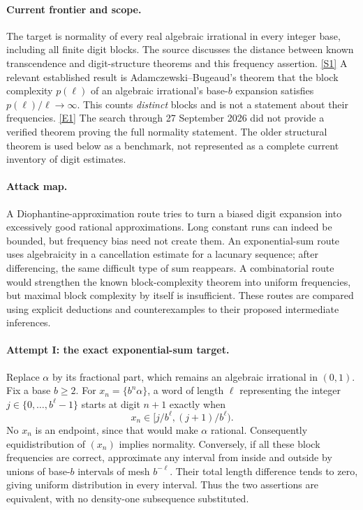 \documentclass[11pt,a4paper]{article}
\newcommand{\sref}[2]{\hyperlink{source:#1:#2}{[S#2]}}
\newcommand{\eref}[2]{\hyperlink{extra:#1:#2}{[E#2]}}
\numberwithin{equation}{section}
\begin{document}
\paragraph{Current frontier and scope.}
The target is normality of every real algebraic irrational in every
integer base, including all finite digit blocks.  The source discusses
the distance between known transcendence and digit-structure theorems
and this frequency assertion. \sref{133}{1}
A relevant established result is Adamczewski--Bugeaud's theorem that
the block complexity $p(\ell)$ of an algebraic irrational's base-$b$
expansion satisfies $p(\ell)/\ell\to\infty$.  This counts \emph{distinct}
blocks and is not a statement about their frequencies.
\eref{133}{1}  The search through 27 September 2026 did not provide a
verified theorem proving the full normality statement.  The older
structural theorem is used below as a benchmark, not represented as
a complete current inventory of digit estimates.

\paragraph{Attack map.}
A Diophantine-approximation route tries to turn a biased digit expansion
into excessively good rational approximations.  Long constant runs
can indeed be bounded, but frequency bias need not create them.
An exponential-sum route uses algebraicity in a cancellation estimate
for a lacunary sequence; after differencing, the same difficult type
of sum reappears.  A combinatorial route would strengthen the known
block-complexity theorem into uniform frequencies, but maximal block
complexity by itself is insufficient.  These routes are compared using
explicit deductions and counterexamples to their proposed intermediate
inferences.

\paragraph{Attempt I: the exact exponential-sum target.}
Replace $\alpha$ by its fractional part, which remains an algebraic
irrational in $(0,1)$.  Fix a base $b\geq2$.  For
$x_n=\{b^n\alpha\}$, a word of length $\ell$ representing the integer
$j\in\{0,\ldots,b^\ell-1\}$ starts at digit $n+1$ exactly when
\[
 x_n\in[j/b^\ell,(j+1)/b^\ell).
\]
No $x_n$ is an endpoint, since that would make $\alpha$ rational.
Consequently equidistribution of $(x_n)$ implies normality.  Conversely,
if all these block frequencies are correct, approximate any interval
from inside and outside by unions of base-$b$ intervals of mesh
$b^{-\ell}$.  Their total length difference tends to zero, giving
uniform distribution in every interval.  Thus the two assertions are
equivalent, with no density-one subsequence substituted.
\end{document}
